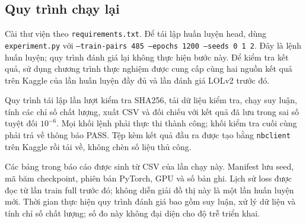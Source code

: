 \documentclass[12pt,a4paper]{article}
\begin{document}
\subsection{Quy trình chạy lại}
Cài thư viện theo \texttt{requirements.txt}. Để tái lập huấn luyện head, dùng \texttt{experiment.py} với \texttt{--train-pairs 485 --epochs 1200 --seeds 0 1 2}. Đây là lệnh huấn luyện; quy trình đánh giá lại không thực hiện bước này. Để kiểm tra kết quả, sử dụng chương trình thực nghiệm được cung cấp cùng hai nguồn kết quả trên Kaggle của lần huấn luyện đầy đủ và lần đánh giá LOLv2 trước đó.

Quy trình tái lập lần lượt kiểm tra SHA256, tải dữ liệu kiểm tra, chạy suy luận, tính các chỉ số chất lượng, xuất CSV và đối chiếu với kết quả đã lưu trong sai số tuyệt đối $10^{-6}$. Mọi khối lệnh phải thực thi thành công; khối kiểm tra cuối cùng phải trả về thông báo PASS. Tệp kèm kết quả đầu ra được tạo bằng \texttt{nbclient} trên Kaggle rồi tải về, không chèn số liệu thủ công.

Các bảng trong báo cáo được sinh từ CSV của lần chạy này. Manifest lưu seed, mã băm checkpoint, phiên bản PyTorch, GPU và số bản ghi. Lịch sử loss được đọc từ lần train full trước đó; không diễn giải đồ thị này là một lần huấn luyện mới. Thời gian thực hiện quy trình đánh giá bao gồm suy luận, xử lý dữ liệu và tính chỉ số chất lượng; số đo này không đại diện cho độ trễ triển khai.
\end{document}
